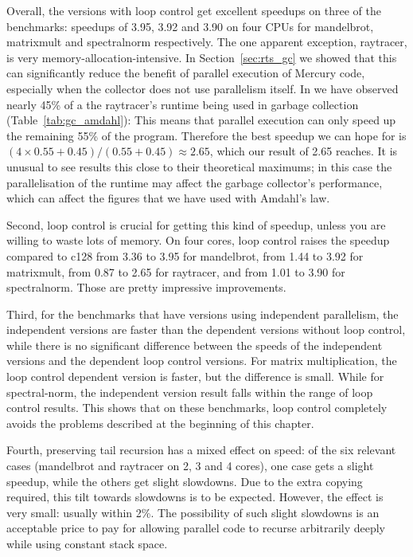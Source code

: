 Overall, the versions with loop control
get excellent speedups on three of the benchmarks:
speedups of 3.95, 3.92 and 3.90 on four CPUs
for mandelbrot, matrixmult and spectralnorm respectively.
The one apparent exception, raytracer,
is very memory-allocation-intensive.
In Section~\ref{sec:rts_gc} we showed that this can significantly reduce the
benefit of parallel execution of Mercury code,
especially when the collector does not use parallelism itself.
In we have observed nearly 45\% of a the raytracer's
runtime being used in garbage collection (Table~\ref{tab:gc_amdahl}):
This means that parallel execution can only speed up the remaining 55\% of
the program.
Therefore the best speedup we can hope for is
$(4 \times 0.55 + 0.45)/(0.55 + 0.45) \approx 2.65$,
which our result of 2.65 reaches.
It is unusual to see results this close to their theoretical maximums;
in this case the parallelisation of the runtime may affect the garbage
collector's performance,
which can affect the figures that we have used with Amdahl's law.

Second,
loop control is crucial for getting this kind of speedup,
unless you are willing to waste lots of memory.
On four cores, loop control raises the speedup compared to c128
from 3.36 to 3.95 for mandelbrot,
from 1.44 to 3.92 for matrixmult,
from 0.87 to 2.65 for raytracer,
and from 1.01 to 3.90 for spectralnorm.
Those are pretty impressive improvements.

Third, for the benchmarks that have versions using independent parallelism,
the independent versions are faster than
the dependent versions without loop control,
while there is no significant difference between
the speeds of the independent versions and the dependent loop control versions.
For matrix multiplication, the loop control dependent version is faster,
but the difference is small.
While for spectral-norm, the independent version result falls within the
    range of loop control results.
This shows that on these benchmarks, loop control completely avoids
the problems described at the beginning of this chapter.

Fourth, preserving tail recursion has a mixed effect on speed:
of the six relevant cases (mandelbrot and raytracer on 2, 3 and 4 cores),
one case gets a slight speedup, while the others get slight slowdowns.
Due to the extra copying required,
this tilt towards slowdowns is to be expected.
However, the effect is very small:
usually within 2\%.
The possibility of such slight slowdowns is an acceptable price to pay
for allowing parallel code to recurse arbitrarily deeply
while using constant stack space.

